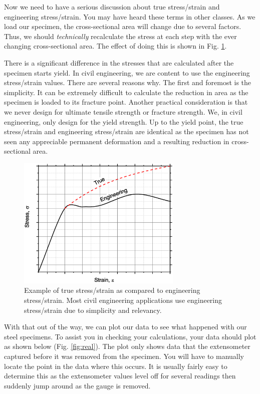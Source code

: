 \documentclass[12pt]{article}
\begin{document}
Now we need to have a serious discussion about true stress/strain and engineering stress/strain. You may have heard these terms in other classes. As we load our specimen, the cross-sectional area will change due to several factors. Thus, we should \textit{technically} recalculate the stress at each step with the ever changing cross-sectional area. The effect of doing this is shown in Fig. \ref{fig:true}. 

There is a significant difference in the stresses that are calculated after the specimen starts yield. In civil engineering, we are content to use the engineering stress/strain values. There are several reasons why. The first and foremost is the simplicity. It can be extremely difficult to calculate the reduction in area as the specimen is loaded to its fracture point. Another practical consideration is that we never design for ultimate tensile strength or fracture strength. We, in civil engineering, only design for the yield strength. Up to the yield point, the true stress/strain and engineering stress/strain are identical as the specimen has not seen any appreciable permanent deformation and a resulting reduction in cross-sectional area.

\begin{figure}[h]
    \centering
    \includegraphics[width=0.7\textwidth]{true.eps}
    \caption{Example of true stress/strain as compared to engineering stress/strain. Most civil engineering applications use engineering stress/strain due to simplicity and relevancy.}
    \label{fig:true}
\end{figure}

With that out of the way, we can plot our data to see what happened with our steel specimens. To assist you in checking your calculations, your data should plot as shown below (Fig. \ref{fig:real}). The plot only shows data that the extensometer captured before it was removed from the specimen. You will have to manually locate the point in the data where this occurs. It is usually fairly easy to determine this as the extensometer values level off for several readings then suddenly jump around as the gauge is removed.
\end{document}
